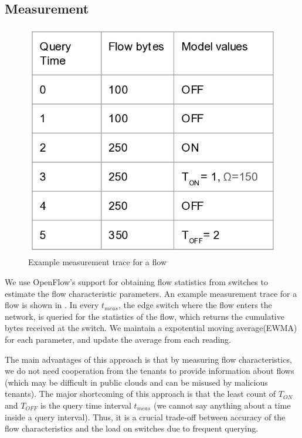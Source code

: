 \subsection{Measurement}
\begin{figure}[H]
	\centering
	\includegraphics[width=\columnwidth]{meastrace.png}
	\caption{Example measurement trace for a flow}
	\label{fig:meastrace}
\end{figure}
We use OpenFlow's support for obtaining flow statistics from 
switches to estimate the flow characteristic parameters. An example
measurement trace for a flow is shown in . In
every $t_{meas}$, the edge switch where the flow enters the network,
 is queried for the statistics of the 
flow, which returns the cumulative bytes received at the switch. We maintain
a expotential moving average(EWMA) for each parameter, and update the average
from each reading. 

The main advantages of this approach is that by measuring flow
characteristics, we do not need cooperation from the tenants to provide information about
flows (which may be difficult in public clouds and can be misused by malicious tenants). The 
major shortcoming of this approach is that the least count of $T_{ON}$ and $T_{OFF}$ is
the query time interval $t_{meas}$ (we cannot say anything about a time inside a query interval).
Thus, it is a crucial trade-off between accuracy of the flow characteristics and the load on switches
due to frequent querying. 

